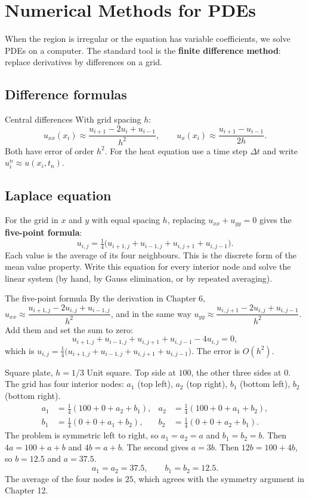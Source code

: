 \chapter{Numerical Methods for PDEs}

When the region is irregular or the equation has variable coefficients, we solve PDEs on a computer. The standard tool is the \textbf{finite difference method}: replace derivatives by differences on a grid.

\section{Difference formulas}

\begin{defbox}{Central differences}
With grid spacing $h$:
\[ u_{xx}(x_i) \approx \frac{u_{i+1} - 2u_i + u_{i-1}}{h^2}, \qquad u_x(x_i)\approx\frac{u_{i+1}-u_{i-1}}{2h}. \]
Both have error of order $h^2$. For the heat equation use a time step $\Delta t$ and write $u_i^n \approx u(x_i, t_n)$.
\end{defbox}

\section{Laplace equation}

For the grid in $x$ and $y$ with equal spacing $h$, replacing $u_{xx}+u_{yy}=0$ gives the \textbf{five-point formula}:
\[ u_{i,j} = \tfrac14\big(u_{i+1,j} + u_{i-1,j} + u_{i,j+1} + u_{i,j-1}\big). \]
Each value is the average of its four neighbours. This is the discrete form of the mean value property. Write this equation for every interior node and solve the linear system (by hand, by Gauss elimination, or by repeated averaging).

\begin{derivbox}{The five-point formula}
By the derivation in Chapter 6, $u_{xx}\approx\dfrac{u_{i+1,j} - 2u_{i,j} + u_{i-1,j}}{h^2}$, and in the same way $u_{yy}\approx\dfrac{u_{i,j+1} - 2u_{i,j} + u_{i,j-1}}{h^2}$. Add them and set the sum to zero:
\[ u_{i+1,j} + u_{i-1,j} + u_{i,j+1} + u_{i,j-1} - 4u_{i,j} = 0, \]
which is $u_{i,j} = \frac14\big(u_{i+1,j} + u_{i-1,j} + u_{i,j+1} + u_{i,j-1}\big)$. The error is $O(h^2)$.
\end{derivbox}

\begin{examplebox}{Square plate, $h=1/3$}
Unit square. Top side at $100$, the other three sides at $0$. The grid has four interior nodes: $a_1$ (top left), $a_2$ (top right), $b_1$ (bottom left), $b_2$ (bottom right).
\begin{align*}
a_1 &= \tfrac14(100 + 0 + a_2 + b_1), & a_2 &= \tfrac14(100 + 0 + a_1 + b_2),\\
b_1 &= \tfrac14(0 + 0 + a_1 + b_2), & b_2 &= \tfrac14(0 + 0 + a_2 + b_1).
\end{align*}
The problem is symmetric left to right, so $a_1=a_2=a$ and $b_1=b_2=b$. Then $4a = 100 + a + b$ and $4b = a + b$. The second gives $a = 3b$. Then $12b = 100 + 4b$, so $b = 12.5$ and $a=37.5$.
\[ a_1=a_2=37.5, \qquad b_1=b_2=12.5. \]
The average of the four nodes is $25$, which agrees with the symmetry argument in Chapter 12.
\end{examplebox}

